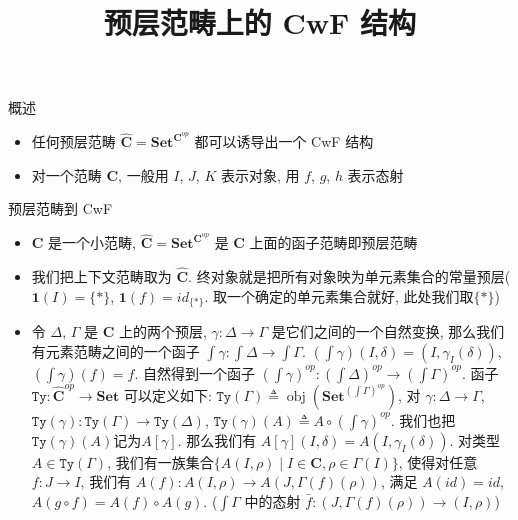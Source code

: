 \documentclass[aspectratio=169,xcolor=dvipsnames]{beamer}
\title{预层范畴上的 CwF 结构}
\date{}
\newcommand\Ty{\mathtt{Ty}}
\newcommand\bfone{\mathbf{1}}
\newcommand\Set{\mathbf{Set}}
\newcommand\C{\mathbf{C}}
\newcommand\hatC{\widehat{\mathbf{C}}}
\DeclareMathOperator\obj{obj}
\begin{document}
\begin{frame}
    \titlepage
\end{frame}

\begin{frame}{概述}
  \begin{itemize}
    \item 任何预层范畴 $\hatC = \Set^{\C^{op}}$ 都可以诱导出一个 CwF 结构
    \item 对一个范畴 $\C$, 一般用 $I$, $J$, $K$ 表示对象, 用 $f$, $g$, $h$ 表示态射
  \end{itemize}
\end{frame}

\begin{frame}[shrink]{预层范畴到 CwF}
\begin{itemize}
  \item $\C$ 是一个小范畴, $\hatC=\Set^{\C^{op}}$ 是 $\C$ 上面的函子范畴即预层范畴
  \item 我们把上下文范畴取为 $\hatC$. 终对象就是把所有对象映为单元素集合的常量预层($\bfone(I)=\{\ast\}$, $\bfone(f) = id_{\{\ast\}}$. 取一个确定的单元素集合就好, 此处我们取$\{\ast\}$)
  \item 令 $\Delta$, $\Gamma$ 是 $\C$ 上的两个预层, $\gamma:\Delta\to\Gamma$ 是它们之间的一个自然变换, 那么我们有元素范畴之间的一个函子 $\int\gamma:\int\Delta\to\int\Gamma$. $(\int\gamma)(I,\delta) = (I,\gamma_{I}(\delta))$, $(\int\gamma)(f) = f$. 自然得到一个函子 $(\int\gamma)^{op}:(\int\Delta)^{op}\to(\int\Gamma)^{op}$. 函子 $\Ty:\hatC^{op}\to\Set$ 可以定义如下: $\Ty(\Gamma) \triangleq \obj(\Set^{(\int\Gamma)^{op}})$, 对 $\gamma:\Delta\to\Gamma$, $\Ty(\gamma):\Ty(\Gamma)\to\Ty(\Delta)$, $\Ty(\gamma)(A) \triangleq A \circ (\int\gamma)^{op}$. 我们也把$\Ty(\gamma)(A)$记为$A[\gamma]$. 那么我们有 $A[\gamma](I,\delta) = A(I,\gamma_I(\delta))$. 对类型 $A\in\Ty(\Gamma)$, 我们有一族集合$\{A(I,\rho) \mid I\in\C, \rho\in\Gamma(I)\}$, 使得对任意 $f : J \to I$, 我们有 $A(f) : A(I,\rho) \to A(J,\Gamma(f)(\rho))$, 满足 $A(id) = id$, $A(g\circ f) = A(f) \circ A(g)$. ($\int\Gamma$ 中的态射 $\bar{f} : (J,\Gamma(f)(\rho)) \to (I, \rho)$)
\end{itemize}
\end{frame}
\end{document}
